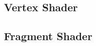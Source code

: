 
\subsection{Vertex Shader}\label{sec:grassVert}







\subsection{Fragment Shader}\label{sec:grassFrag}








